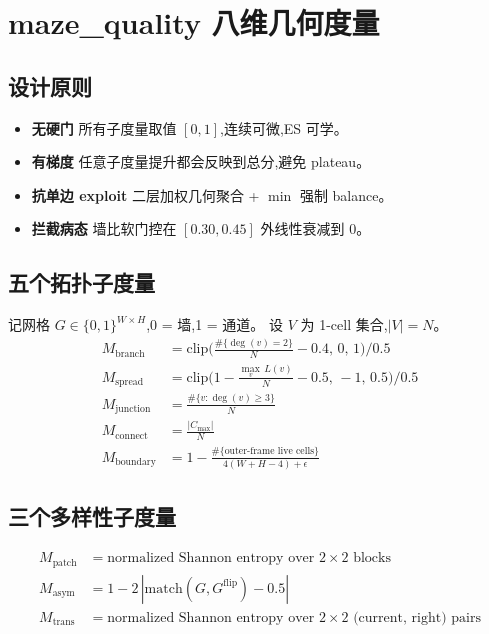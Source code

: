 \documentclass[11pt,a4paper]{article}
\begin{document}
\section{maze\_quality 八维几何度量}
\subsection{设计原则}
\begin{itemize}[leftmargin=*,itemsep=0pt,topsep=0pt]
\item \textbf{无硬门} 所有子度量取值 $[0,1]$,连续可微,ES 可学。
\item \textbf{有梯度} 任意子度量提升都会反映到总分,避免 plateau。
\item \textbf{抗单边 exploit} 二层加权几何聚合 + $\min$ 强制 balance。
\item \textbf{拦截病态} 墙比软门控在 $[0.30, 0.45]$ 外线性衰减到 0。
\end{itemize}

\subsection{五个拓扑子度量}
记网格 $G \in \{0, 1\}^{W\times H}$,0 = 墙,1 = 通道。
设 $V$ 为 1-cell 集合,$|V| = N$。
\begin{align}
M_{\text{branch}} &= \text{clip}\!\Big(\frac{\#\{\deg(v)=2\}}{N} - 0.4,\, 0,\, 1\Big) \big/ 0.5 \\
M_{\text{spread}} &= \text{clip}\!\Big(1 - \frac{\max_v\, L(v)}{N} - 0.5,\, -1,\, 0.5\Big) \big/ 0.5 \\
M_{\text{junction}} &= \frac{\#\{v : \deg(v) \ge 3\}}{N} \\
M_{\text{connect}} &= \frac{|C_{\max}|}{N} \\
M_{\text{boundary}} &= 1 - \frac{\#\{\text{outer-frame live cells}\}}{4(W+H-4)+\epsilon}
\end{align}

\subsection{三个多样性子度量}
\begin{align}
M_{\text{patch}} &= \text{normalized Shannon entropy over } 2\times 2 \text{ blocks} \\
M_{\text{asym}} &= 1 - 2\,|\text{match}(G, G^{\text{flip}}) - 0.5| \\
M_{\text{trans}} &= \text{normalized Shannon entropy over } 2\times 2 \text{ (current, right) pairs}
\end{align}
\end{document}
